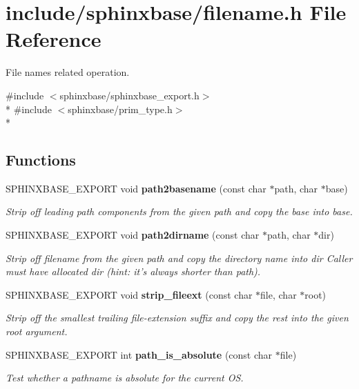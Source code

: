 \section{include/sphinxbase/filename.h File Reference}
\label{filename_8h}


File names related operation.  


{\ttfamily \#include $<$sphinxbase/sphinxbase\-\_\-export.\-h$>$}\\*
{\ttfamily \#include $<$sphinxbase/prim\-\_\-type.\-h$>$}\\*
\subsection*{Functions}
\begin{DoxyCompactItemize}
\item 
S\-P\-H\-I\-N\-X\-B\-A\-S\-E\-\_\-\-E\-X\-P\-O\-R\-T void {\bf path2basename} (const char $\ast$path, char $\ast$base)
\begin{DoxyCompactList}\small\item\em Strip off leading path components from the given path and copy the base into base. \end{DoxyCompactList}\item 
S\-P\-H\-I\-N\-X\-B\-A\-S\-E\-\_\-\-E\-X\-P\-O\-R\-T void {\bf path2dirname} (const char $\ast$path, char $\ast$dir)\label{filename_8h_a678be92ddb74695f26a9e4f527b073b0}

\begin{DoxyCompactList}\small\item\em Strip off filename from the given path and copy the directory name into dir Caller must have allocated dir (hint\-: it's always shorter than path). \end{DoxyCompactList}\item 
S\-P\-H\-I\-N\-X\-B\-A\-S\-E\-\_\-\-E\-X\-P\-O\-R\-T void {\bf strip\-\_\-fileext} (const char $\ast$file, char $\ast$root)
\begin{DoxyCompactList}\small\item\em Strip off the smallest trailing file-\/extension suffix and copy the rest into the given root argument. \end{DoxyCompactList}\item 
S\-P\-H\-I\-N\-X\-B\-A\-S\-E\-\_\-\-E\-X\-P\-O\-R\-T int {\bf path\-\_\-is\-\_\-absolute} (const char $\ast$file)\label{filename_8h_ac59add2db73b33e81b354de114268e7a}

\begin{DoxyCompactList}\small\item\em Test whether a pathname is absolute for the current O\-S. \end{DoxyCompactList}\end{DoxyCompactItemize}


